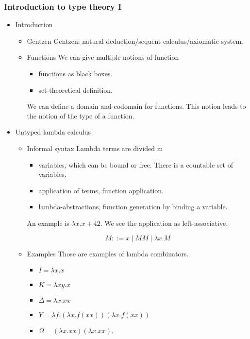 \documentclass[11pt]{article}
\begin{document}
\subsubsection*{Introduction to type theory I}
\label{sec-9-1-2}
\begin{itemize}
\item Introduction
\label{sec-9-1-2-1}
\begin{itemize}
\item Gentzen
\label{sec-9-1-2-1-1}
Gentzen: natural deduction/sequent calculus/axiomatic system.
\item Functions
\label{sec-9-1-2-1-2}
We can give multiple notions of function

\begin{itemize}
\item functions as black boxes.
\item set-theoretical definition.
\end{itemize}

We can define a domain and codomain for functions. This notion leads
to the notion of the type of a function.
\end{itemize}

\item Untyped lambda calculus
\label{sec-9-1-2-2}
\begin{itemize}
\item Informal syntax
\label{sec-9-1-2-2-1}
Lambda terms are divided in

\begin{itemize}
\item variables, which can be bound or free. There is a countable set of
variables.
\item application of terms, function application.
\item lambda-abstractions, function generation by binding a variable.
\end{itemize}

An example is $\lambda x. x+42$. We see the application as left-associative.

\[
M ::= x \mid MM \mid \lambda x.M
\]

\item Examples
\label{sec-9-1-2-2-2}
Those are examples of lambda combinators.

\begin{itemize}
\item $I = \lambda x.x$
\item $K = \lambda xy. x$
\item $\Delta = \lambda x . xx$
\item $Y = \lambda f.(\lambda x. f(xx))(\lambda x. f(xx))$
\item $\Omega = (\lambda x.xx)(\lambda x.xx)$.
\end{itemize}


\end{itemize}
\end{itemize}
\end{document}
